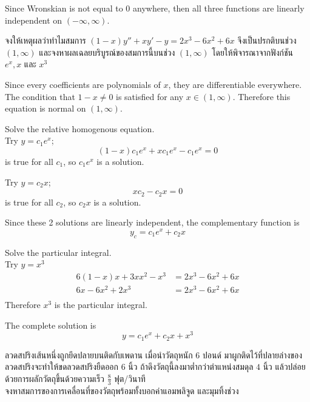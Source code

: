 \documentclass[12pt,final]{novelette} %
\begin{document}
\begin{question}
    Since Wronskian is not equal to $0$ anywhere, then all three functions are linearly independent on $(-\infty, \infty)$.

    \item {}
    จงให้เหตุผลว่าทําไมสมการ $(1-x)y'' + xy' - y = 2x^3 - 6x^2 + 6x$ จึงเป็นปรกติบนช่วง $(1, \infty)$
    และจงหาผลเฉลยบริบูรณ์ของสมการนี้บนช่วง $(1, \infty)$ โดยให้พิจารณาจากฟังก์ชัน $e^x, x$ และ $x^3$ 

    \bigskip
    Since every coefficients are polynomials of $x$, they are differentiable everywhere.
    The condition that $1-x \neq 0$ is satisfied for any $x \in (1, \infty)$.
    Therefore this equation is normal on $(1, \infty)$.

    \medskip
    Solve the relative homogenous equation. \\
    Try $y = c_1 e^x$;
    $$
        (1-x)c_1 e^x + x c_1 e^x - c_1 e^x = 0
    $$
    is true for all $c_1$, so $c_1 e^x$ is a solution.

    Try $y = c_2 x$;
    $$
        x c_2 - c_2 x = 0
    $$
    is true for all $c_2$, so $c_2 x$ is a solution.

    \medskip
    Since these 2 solutions are linearly independent, the complementary function is
    $$
        y_c = c_1 e^x + c_2 x
    $$

    \medskip
    Solve the particular integral. \\
    Try $y = x^3$
    \begin{align*}
        6 (1-x) x + 3 x x^2 - x^3 & = 2x^3 - 6x^2 + 6x \\
        6x - 6x^2 + 2x^3          & = 2x^3 - 6x^2 + 6x \\
    \end{align*}
    Therefore $x^3$ is the particular integral.

    \medskip
    The complete solution is
    $$
        \boxed{y = c_1 e^x + c_2 x + x^3}
    $$

    \item {}
    ลวดสปริงเส้นหนึ่งถูกยึดปลายบนติดกับเพดาน
    เมื่อนําวัตถุหนัก $6$ ปอนด์ มาผูกติดไว้ที่ปลายล่างของลวดสปริงจะทําให้ขดลวดสปริงยืดออก $6$ นิ้ว
    ถ้าดึงวัตถุนี้ลงมาต่ำกว่าตำแหน่งสมดุล $4$ นิ้ว แล้วปล่อยด้วยการผลักวัตถุขึ้นด้วยความเร็ว $\frac83$ ฟุต/วินาที \\
    จงหาสมการของการเคลื่อนที่ของวัตถุพร้อมทั้งบอกค่าแอมพลิจูด และมุมทิ้งช่วง 


\end{question}
\end{document}
